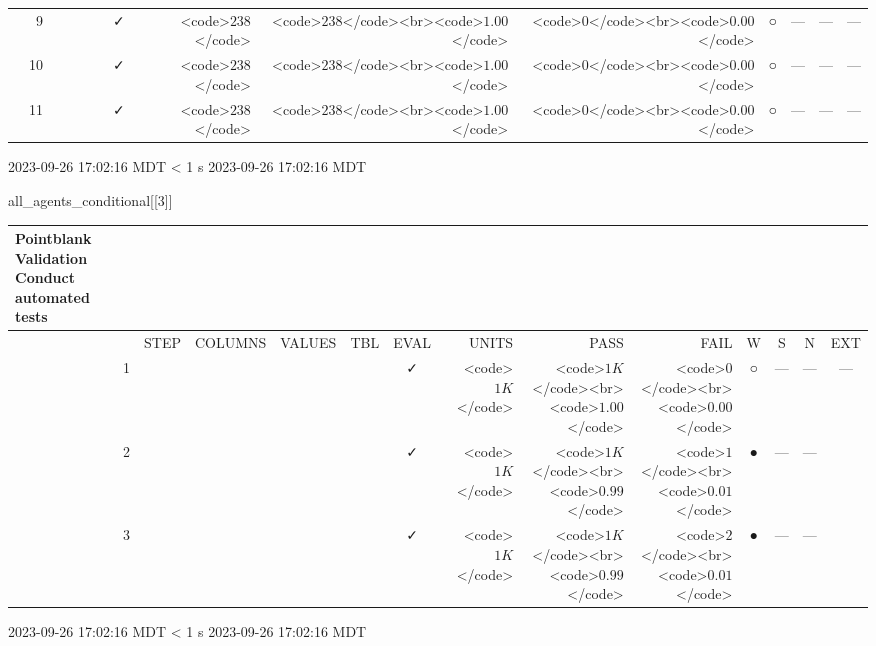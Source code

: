 \documentclass[
  letterpaper,
  DIV=11,
  numbers=noendperiod]{scrreprt}
\newenvironment{Shaded}{\begin{snugshade}}{\end{snugshade}}
\newcommand{\DecValTok}[1]{\textcolor[rgb]{0.68,0.00,0.00}{#1}}
\newcommand{\NormalTok}[1]{\textcolor[rgb]{0.00,0.23,0.31}{#1}}
\begin{document}
\begin{longtable}{lrlllccrrrcccc}
 & 9 &  &  &  &                                                              & ✓ & <code>$238$</code> & <code>$238$</code><br><code>$1.00$</code> & <code>$0$</code><br><code>$0.00$</code> & ○ & --- & --- & --- \\ 
 & 10 &  &  &  &                                                              & ✓ & <code>$238$</code> & <code>$238$</code><br><code>$1.00$</code> & <code>$0$</code><br><code>$0.00$</code> & ○ & --- & --- & --- \\ 
 & 11 &  &  &  &                                                              & ✓ & <code>$238$</code> & <code>$238$</code><br><code>$1.00$</code> & <code>$0$</code><br><code>$0.00$</code> & ○ & --- & --- & --- \\ 
\bottomrule
\end{longtable}
\begin{minipage}{\linewidth}
2023-09-26 17:02:16 MDT
\textless{} 1 s
2023-09-26 17:02:16 MDT\\
\end{minipage}

\begin{Shaded}
\begin{Highlighting}[]
\NormalTok{all\_agents\_conditional[[}\DecValTok{3}\NormalTok{]]}
\end{Highlighting}
\end{Shaded}

\setlength{\LTpost}{0mm}
\begin{longtable}{lrlllccrrrcccc}
\caption*{
{\large Pointblank Validation} \\ 
{\small Conduct automated tests}
} \\ 
\toprule
 &  & STEP & COLUMNS & VALUES & TBL & EVAL & UNITS & PASS & FAIL & W & S & N & EXT \\ 
\midrule
 & 1 &  &  &  &                                                              & ✓ & <code>$1K$</code> & <code>$1K$</code><br><code>$1.00$</code> & <code>$0$</code><br><code>$0.00$</code> & ○ & --- & --- & --- \\ 
 & 2 &  &  &  &                                                              & ✓ & <code>$1K$</code> & <code>$1K$</code><br><code>$0.99$</code> & <code>$1$</code><br><code>$0.01$</code> & ● & --- & --- &  \\ 
 & 3 &  &  &  &                                                              & ✓ & <code>$1K$</code> & <code>$1K$</code><br><code>$0.99$</code> & <code>$2$</code><br><code>$0.01$</code> & ● & --- & --- &  \\ 
\bottomrule
\end{longtable}
\begin{minipage}{\linewidth}
2023-09-26 17:02:16 MDT
\textless{} 1 s
2023-09-26 17:02:16 MDT\\
\end{minipage}
\end{document}
